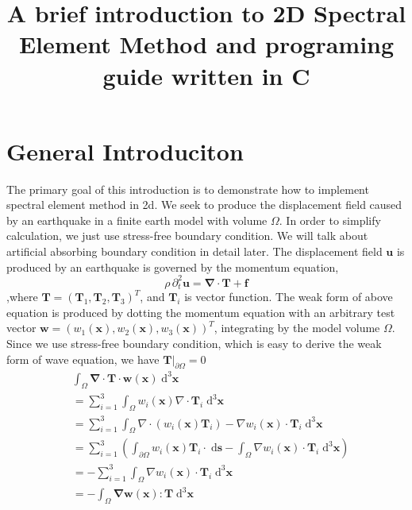\documentclass{article}
\title{A brief introduction to 2D Spectral Element Method and programing guide written in C}
\begin{document}
  \maketitle
    \titlepage

  \section{General Introduciton}
  The primary goal of this introduction is to demonstrate how to implement spectral element method in 2d. We seek to produce the displacement field caused by an earthquake in a finite earth model with volume $\Omega$. In order to simplify calculation, we just use stress-free boundary condition.  We will  talk about artificial absorbing  boundary condition in detail later.
  The displacement field $\boldsymbol{u}$ is produced by an earthquake is governed by the momentum equation,
  \begin{equation}
  \rho\,\partial_t^2\boldsymbol{u}=\boldsymbol{\nabla}\cdot\boldsymbol{T}+\boldsymbol{f}
  \end{equation}
  ,where $\boldsymbol T =(\boldsymbol T_1,\boldsymbol T_2,\boldsymbol T_3)^T$, and $\boldsymbol T_i$ is vector function.
  The weak form of above equation is produced by dotting the momentum equation with an arbitrary test vector $\boldsymbol{w}=(w_1(\boldsymbol x),w_2(\boldsymbol x),w_3(\boldsymbol x))^T $, integrating by the model volume $\Omega$. Since we use stress-free boundary condition, which is easy to derive the weak form of wave equation, we have $\boldsymbol T|_{\partial \Omega} = 0$
  \begin{equation}
  \begin{aligned}
  &\int_\Omega \boldsymbol{\nabla}\cdot\boldsymbol{T}\cdot\boldsymbol w(\boldsymbol{x})\;\mathrm{d}^3\boldsymbol{x}\\
  & = \sum _{i=1}^3\int_\Omega w_i(\boldsymbol{x})\nabla\cdot\boldsymbol{T}_i\;\mathrm{d}^3\boldsymbol{x}\\
  & = \sum_{i=1}^3\int_\Omega \nabla\cdot(w_i(\boldsymbol{x})\boldsymbol{T}_i) - \nabla w_i(\boldsymbol x) \cdot\boldsymbol T_i\;\mathrm{d}^3\boldsymbol{x}\\
  & = \sum_{i=1}^3\left(\int_{\partial\Omega} w_i(\boldsymbol{x})\boldsymbol T_i \cdot \;\mathrm{d}\boldsymbol{s}-\int_\Omega\nabla w_i(\boldsymbol x) \cdot\boldsymbol T_i\;\mathrm{d}^3\boldsymbol{x} \right)\\
  & = -\sum_{i=1}^3\int_\Omega\nabla w_i(\boldsymbol x) \cdot\boldsymbol T_i\;\mathrm{d}^3\boldsymbol{x}\\
  & = -\int_\Omega \boldsymbol{\nabla}\boldsymbol w(\boldsymbol x): \boldsymbol T\;\mathrm{d}^3\boldsymbol x
  \end{aligned}
  \end{equation}
\end{document}
